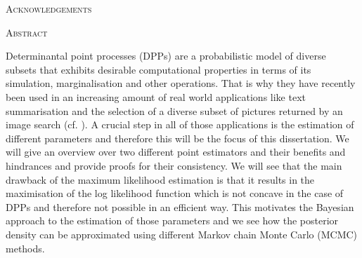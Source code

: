 \begin{center}
{\LARGE\textsc{Acknowledgements}\\[.9cm]}
\begin{minipage}{11cm}
\end{minipage}
\end{center}

\clearpage


\begin{center}
{\LARGE\textsc{Abstract}\\[.9cm]}
\begin{minipage}{11cm}
Determinantal point processes (DPPs) are a probabilistic model of diverse subsets that exhibits desirable computational properties in terms of its simulation, marginalisation and other operations. That is why they have recently been used in an increasing amount of real world applications like text summarisation and the selection of a diverse subset of pictures returned by an image search (cf. \cite{kulesza2012learning}). A crucial step in all of those applications is the estimation of different parameters and therefore this will be the focus of this dissertation. We will give an overview over two different point estimators and their benefits and hindrances and provide proofs for their consistency. We will see that the main drawback of the maximum likelihood estimation is that it results in the maximisation of the log likelihood function which is not concave in the case of DPPs and therefore not possible in an efficient way. This motivates the Bayesian approach to the estimation of those parameters and we see how the posterior density can be approximated using different Markov chain Monte Carlo (MCMC) methods.
\end{minipage}
\end{center}


\clearpage
